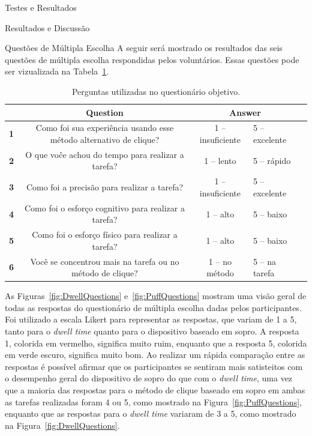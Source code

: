 \begin{chapter}{Testes e Resultados}
\begin{section}{Resultados e Discussão}
\begin{subsection}{Questões de Múltipla Escolha}
A seguir será mostrado os resultados das seis questões de múltipla escolha 
respondidas pelos voluntários. Essas questões pode ser vizualizada na
Tabela~\ref{tab:quest}.

\begin{table}[!h]
\centering
\small
\def\arraystretch{1.0}
\begin{tabular}{p{2cm}cc|ll}
	\hline
	\hline
	~ & \textbf{Question} &\multicolumn{2}{c}{\textbf{Answer}} \\
	\hline
	\textbf{1} & Como foi sua experiência usando esse método alternativo de clique? & 1 -- insuficiente        & 5 -- excelente   \\
	\textbf{2} & O que voĉe achou do tempo para realizar a tarefa?                  & 1 -- lento               & 5 -- rápido      \\
	\textbf{3} & Como foi a precisão para realizar a tarefa?                        & 1 -- insuficiente        & 5 -- excelente   \\
	\textbf{4} & Como foi o esforço cognitivo para realizar a tarefa?               & 1 -- alto                & 5 -- baixo       \\
	\textbf{5} & Como foi o esforço físico para realizar a tarefa?                  & 1 -- alto                & 5 -- baixo       \\
	\textbf{6} & Você se concentrou mais na tarefa ou no método de clique?          & 1 -- no método           & 5 -- na tarefa   \\
	\hline
	\hline
\end{tabular}
\caption{Perguntas utilizadas no questionário objetivo.}
\label{tab:quest}
\end{table}

As Figuras~\ref{fig:DwellQuestions} e~\ref{fig:PuffQuestions} mostram uma visão
geral de todas as respostas do questionário de múltipla escolha dadas pelos
participantes. Foi utilizado a escala Likert para representar as respostas, que
variam de 1 a 5, tanto para o \textit{dwell time} quanto para o dispositivo
baseado em sopro.  A resposta 1, colorida em vermelho, significa muito ruim,
enquanto que a resposta 5, colorida em verde escuro, significa muito bom. Ao
realizar um rápida comparação entre as respostas é possível afirmar que os
participantes se sentiram mais satisteitos com o desempenho geral do dispositivo
de sopro do que com o \textit{dwell time}, uma vez que a maioria das respostas
para o método de clique baseado em sopro em ambas as tarefas realizadas foram 4
ou 5, como mostrado na Figura~\ref{fig:PuffQuestions}, enquanto que as respostas
para o \textit{dwell time} variaram de 3 a 5, como mostrado na
Figura~\ref{fig:DwellQuestions}.  


\end{subsection}
\end{section}
\end{chapter}
